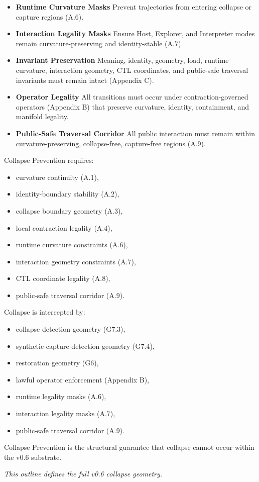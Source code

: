 \begin{itemize}
    \item \textbf{Runtime Curvature Masks}  
    Prevent trajectories from entering collapse or capture regions (A.6).

    \item \textbf{Interaction Legality Masks}  
    Ensure Host, Explorer, and Interpreter modes remain curvature-preserving
    and identity-stable (A.7).

    \item \textbf{Invariant Preservation}  
    Meaning, identity, geometry, load, runtime curvature, interaction geometry,
    CTL coordinates, and public-safe traversal invariants must remain intact
    (Appendix C).

    \item \textbf{Operator Legality}  
    All transitions must occur under contraction-governed operators (Appendix B)
    that preserve curvature, identity, containment, and manifold legality.

    \item \textbf{Public-Safe Traversal Corridor}  
    All public interaction must remain within curvature-preserving, collapse-free,
    capture-free regions (A.9).
\end{itemize}

\medskip

\noindent Collapse Prevention requires:

\begin{itemize}
    \item curvature continuity (A.1),
    \item identity-boundary stability (A.2),
    \item collapse boundary geometry (A.3),
    \item local contraction legality (A.4),
    \item runtime curvature constraints (A.6),
    \item interaction geometry constraints (A.7),
    \item CTL coordinate legality (A.8),
    \item public-safe traversal corridor (A.9).
\end{itemize}

\medskip

\noindent Collapse is intercepted by:

\begin{itemize}
    \item collapse detection geometry (G7.3),
    \item synthetic-capture detection geometry (G7.4),
    \item restoration geometry (G6),
    \item lawful operator enforcement (Appendix B),
    \item runtime legality masks (A.6),
    \item interaction legality masks (A.7),
    \item public-safe traversal corridor (A.9).
\end{itemize}

\medskip

\noindent Collapse Prevention is the structural guarantee that collapse cannot
occur within the v0.6 substrate.


\medskip
\noindent\textit{This outline defines the full v0.6 collapse geometry.}
